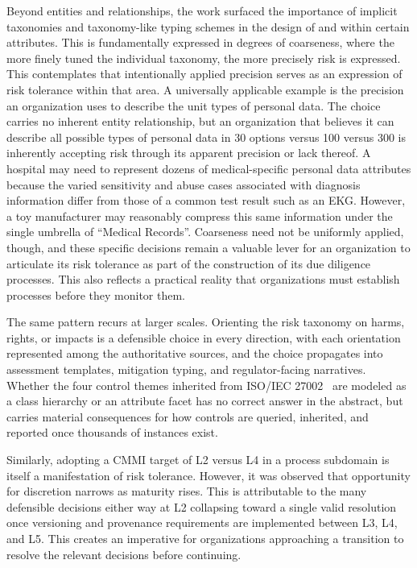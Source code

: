 \documentclass[10pt,letterpaper,twocolumn,twoside]{rho-class/rho}
\begin{document}
Beyond entities and relationships, the work surfaced the importance of implicit taxonomies and taxonomy-like typing schemes in the design of and within certain attributes. This is fundamentally expressed in degrees of coarseness, where the more finely tuned the individual taxonomy, the more precisely risk is expressed. This contemplates that intentionally applied precision serves as an expression of risk tolerance within that area. A universally applicable example is the precision an organization uses to describe the unit types of personal data. The choice carries no inherent entity relationship, but an organization that believes it can describe all possible types of personal data in 30 options versus 100 versus 300 is inherently accepting risk through its apparent precision or lack thereof. A hospital may need to represent dozens of medical-specific personal data attributes because the varied sensitivity and abuse cases associated with diagnosis information differ from those of a common test result such as an EKG. However, a toy manufacturer may reasonably compress this same information under the single umbrella of ``Medical Records''. Coarseness need not be uniformly applied, though, and these specific decisions remain a valuable lever for an organization to articulate its risk tolerance as part of the construction of its due diligence processes. This also reflects a practical reality that organizations must establish processes before they monitor them.

The same pattern recurs at larger scales. Orienting the risk taxonomy on harms, rights, or impacts is a defensible choice in every direction, with each orientation represented among the authoritative sources, and the choice propagates into assessment templates, mitigation typing, and regulator-facing narratives. Whether the four control themes inherited from ISO/IEC
27002~\cite{iso27002} are modeled as a class hierarchy or an attribute facet has no correct answer in the abstract, but carries material consequences for how controls are queried, inherited, and reported once thousands of instances exist.

Similarly, adopting a CMMI target of L2 versus L4 in a process subdomain is itself a manifestation of risk tolerance. However, it was observed that opportunity for discretion narrows as maturity rises. This is attributable to the many defensible decisions either way at L2 collapsing toward a single valid resolution once versioning and provenance requirements are implemented between L3, L4, and L5. This creates an imperative for organizations approaching a transition to resolve the relevant decisions before continuing. 
\end{document}
